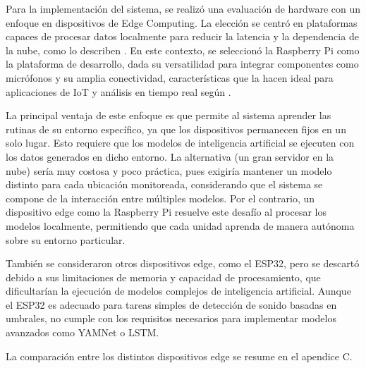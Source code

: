 
Para la implementación del sistema, se realizó una evaluación de hardware con un enfoque en dispositivos de Edge Computing. La elección se centró en plataformas capaces de procesar datos localmente para reducir la latencia y la dependencia de la nube, como lo describen \citeauthor{shi_edge_2016} \citeyear{shi_edge_2016}. En este contexto, se seleccionó la Raspberry Pi como la plataforma de desarrollo, dada su versatilidad para integrar componentes como micrófonos y su amplia conectividad, características que la hacen ideal para aplicaciones de IoT y análisis en tiempo real según \citeauthor{richardson_getting_2016} \citeyear{richardson_getting_2016}.

La principal ventaja de este enfoque es que permite al sistema aprender las rutinas de su entorno específico, ya que los dispositivos permanecen fijos en un solo lugar. Esto requiere que los modelos de inteligencia artificial se ejecuten con los datos generados en dicho entorno. La alternativa (un gran servidor en la nube) sería muy costosa y poco práctica, pues exigiría mantener un modelo distinto para cada ubicación monitoreada, considerando que el sistema se compone de la interacción entre múltiples modelos. Por el contrario, un dispositivo edge como la Raspberry Pi resuelve este desafío al procesar los modelos localmente, permitiendo que cada unidad aprenda de manera autónoma sobre su entorno particular.

También se consideraron otros dispositivos edge, como el ESP32, pero se descartó debido a sus limitaciones de memoria y capacidad de procesamiento, que dificultarían la ejecución de modelos complejos de inteligencia artificial. Aunque el ESP32 es adecuado para tareas simples de detección de sonido basadas en umbrales, no cumple con los requisitos necesarios para implementar modelos avanzados como YAMNet o LSTM.

La comparación entre los distintos dispositivos edge se resume en el apendice C.






